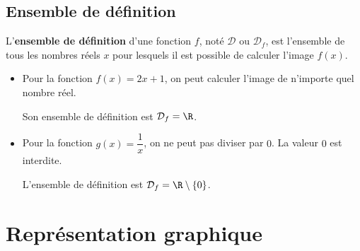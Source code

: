 \subsection{Ensemble de définition}

\begin{df}
	L'\textbf{ensemble de définition} d'une fonction $f$, noté $\mathcal{D}$ ou $\mathcal{D}_f$, est l'ensemble de tous les nombres réels $x$ pour lesquels il est possible de calculer l'image $f(x)$.
\end{df}

\begin{ex}
	\nline
	\begin{itemize}
		\item Pour la fonction $f(x)=2x+1$, on peut calculer l'image de n'importe quel nombre réel.

		      Son ensemble de définition est $\mathcal{D}_f=\R$.
		\item Pour la fonction $g(x)=\dfrac{1}{x}$, on ne peut pas diviser par $0$. La valeur $0$ est interdite.

		      L'ensemble de définition est $\mathcal{D}_f=\R \setminus \{0\}$.
	\end{itemize}
\end{ex}

\section{Représentation graphique}

